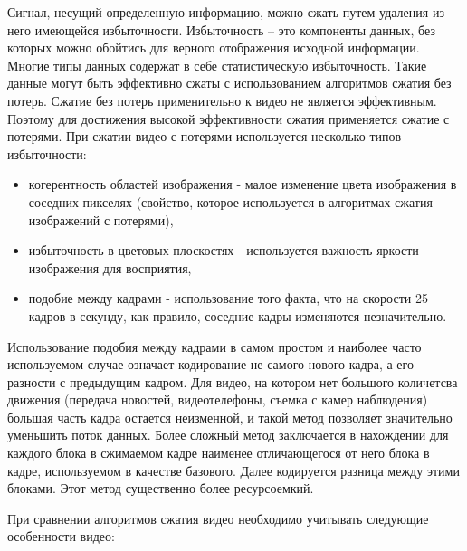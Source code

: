 Сигнал, несущий определенную информацию, можно сжать путем
удаления из него имеющейся избыточности. Избыточность – это компоненты
данных, без которых можно обойтись для верного отображения исходной 
информации. Многие типы данных содержат в себе статистическую
избыточность. Такие данные могут быть эффективно сжаты с использованием
алгоритмов сжатия без потерь. Сжатие без потерь применительно к
видео не является эффективным. Поэтому для достижения
высокой эффективности сжатия применяется сжатие с потерями. При
сжатии видео с потерями используется несколько типов избыточности:
\begin{itemize}
\item когерентность областей изображения - малое изменение цвета изображения
в соседних пикселях (свойство, которое используется в алгоритмах
сжатия изображений с потерями),
\item избыточность в цветовых плоскостях - используется важность
яркости изображения для восприятия,
\item подобие между кадрами - использование того факта, что на скорости 25
кадров в секунду, как правило, соседние кадры изменяются незначительно.
\end{itemize}

Использование подобия между кадрами в самом простом и наиболее
часто используемом случае означает кодирование не самого нового кадра, а его
разности с предыдущим кадром. Для видео, на котором нет большого количетсва движения (передача
новостей, видеотелефоны, съемка с камер наблюдения) большая часть кадра остается неизменной, и
такой метод позволяет значительно уменьшить поток данных. Более
сложный метод заключается в нахождении для каждого блока в сжимаемом
кадре наименее отличающегося от него блока в кадре, используемом в качестве
базового. Далее кодируется разница между этими блоками. Этот метод
существенно более ресурсоемкий.

При сравнении алгоритмов сжатия видео необходимо учитывать следующие особенности видео:

